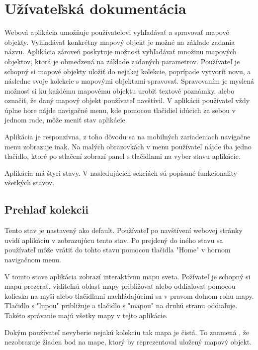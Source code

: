 \chapter{Užívateľská dokumentácia}

Webová aplikácia umožňuje používateľovi vyhľadávať a spravovať mapové objekty. Vyhľadávať konkrétny mapový objekt je možné na základe zadania názvu.
Aplikácia zároveň poskytuje možnosť vyhľadávať množinu mapových objektov, ktorá je obmedzená na základe zadaných parametrov. Používateľ je schopný si
mapové objekty uložiť do nejakej kolekcie, poprípade vytvoriť novu, a následne svoje kolekcie s mapovými objektami spravovať. Spravovaním je myslená možnosť
si ku každému mapovému objektu urobiť textové poznámky, alebo označiť, že daný mapový objekt používateľ navštívil.
V aplikácii používateľ vždy úplne hore nájde navigačné menu, kde pomocou tlačidiel idúcich za sebou v jednom rade, môže meniť stav aplikácie.

Aplikácia je responzívna, z toho dôvodu sa na mobilných zariadeniach navigačne menu zobrazuje inak.
Na malých obrazovkách v menu používateľ nájde iba jedno tlačidlo, ktoré po stlačení zobrazí panel s tlačidlami na vyber stavu aplikácie.

Aplikácia má štyri stavy. V nasledujúcich sekciách sú popísané funkcionality všetkých stavov.

\section{Prehlaď kolekcii}
Tento stav je nastavený ako default. Používateľ po navštívení webovej stránky uvidí aplikáciu v zobrazujúcu tento stav.
Po prejdený do iného stavu sa používateľ môže vrátiť do tohto stavu pomocou tlačidla "Home" v hornom  navigačnom menu.

V tomto stave aplikácia zobrazí interaktívnu mapu sveta. Požívateľ je schopný si mapu prezerať, viditeľnú oblasť mapy približovať alebo oddiaľovať pomocou
kolieska na myši alebo tlačidlami nachládajúcimi sa v pravom dolnom rohu mapy. Tlačidlo s "lupou" približuje  a tlačidlo s "mapou" na druhú stranu oddiaľuje.
Takéto správanie majú všetky mapy v tejto aplikácie.

Dokým používateľ nevyberie nejakú kolekciu tak mapa je čistá. To znamená , že nezobrazuje žiaden bod na mape, ktorý by reprezentoval uložený mapový objekt.

